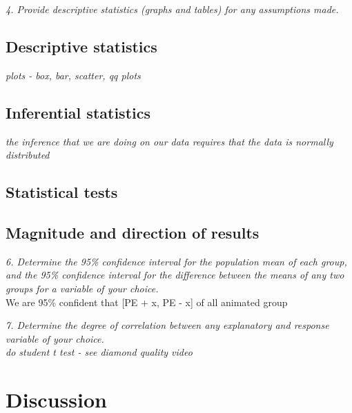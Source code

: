 \documentclass[
  10pt,
]{article}
\begin{document}
\emph{4. Provide descriptive statistics (graphs and tables) for any
assumptions made.}\\

\hypertarget{descriptive-statistics}{%
\subsection{Descriptive statistics}\label{descriptive-statistics}}

\emph{plots - box, bar, scatter, qq plots}

\hypertarget{inferential-statistics}{%
\subsection{Inferential statistics}\label{inferential-statistics}}

\emph{the inference that we are doing on our data requires that the data
is normally distributed}\\

\hypertarget{statistical-tests}{%
\subsection{Statistical tests}\label{statistical-tests}}

\hypertarget{magnitude-and-direction-of-results}{%
\subsection{Magnitude and direction of
results}\label{magnitude-and-direction-of-results}}

\emph{6. Determine the 95\% confidence interval for the population mean
of each group, and the 95\% confidence interval for the difference
between the means of any two groups for a variable of your choice.}\\

We are 95\% confident that {[}PE + x, PE - x{]} of all animated group

\emph{7. Determine the degree of correlation between any explanatory and
response variable of your choice.}\\

\emph{do student t test - see diamond quality video}

\hypertarget{discussion}{%
\section{Discussion}\label{discussion}}
\end{document}
